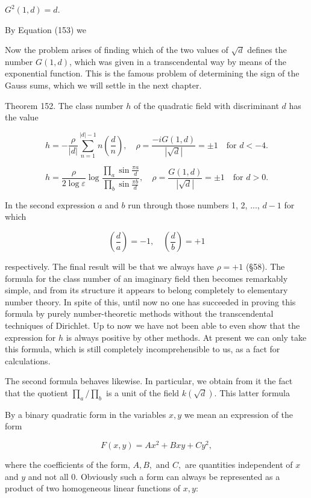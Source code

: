 $G^2(1, d) = d$.

By Equation (153) we

Now the problem arises of finding which of the two values of $\sqrt{d}$ defines the number $G(1, d)$, which was given in a transcendental way by means of the exponential function. This is the famous problem of determining the sign of the Gauss sums, which we will settle in the next chapter.

Theorem 152. The class number $h$ of the quadratic field with discriminant $d$ has the value

$$h = -\frac{\rho}{|d|} \sum_{n=1}^{|d|-1} n \left( \frac{d}{n} \right), \quad \rho = \frac{-iG(1, d)}{|\sqrt{d}|} = \pm 1 \quad \text{for } d < -4.$$

$$h = \frac{\rho}{2 \log \varepsilon} \log \frac{\prod_a \sin \frac{\pi a}{d}}{\prod_b \sin \frac{\pi b}{d}}, \quad \rho = \frac{G(1, d)}{|\sqrt{d}|} = \pm 1 \quad \text{for } d > 0.$$

In the second expression $a$ and $b$ run through those numbers 1, 2, ..., $d-1$ for which

$$\left( \frac{d}{a} \right) = -1, \quad \left( \frac{d}{b} \right) = +1$$

respectively. The final result will be that we always have $\rho = +1$ (§58). The formula for the class number of an imaginary field then becomes remarkably simple, and from its structure it appears to belong completely to elementary number theory. In spite of this, until now no one has succeeded in proving this formula by purely number-theoretic methods without the transcendental techniques of Dirichlet. Up to now we have not been able to even show that the expression for $h$ is always positive by other methods. At present we can only take this formula, which is still completely incomprehensible to us, as a fact for calculations.

The second formula behaves likewise. In particular, we obtain from it the fact that the quotient $\prod_a / \prod_b$ is a unit of the field $k(\sqrt{d})$. This latter formula

By a binary quadratic form in the variables $x, y$ we mean an expression of the form

$$F(x, y) = Ax^2 + Bxy + Cy^2,$$

where the coefficients of the form, $A, B,$ and $C,$ are quantities independent of $x$ and $y$ and not all 0. Obviously such a form can always be represented as a product of two homogeneous linear functions of $x, y$:

